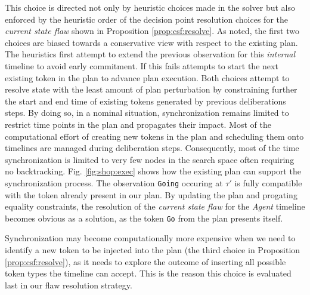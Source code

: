 This choice is directed not only by heuristic choices made in the
solver but also enforced by the heuristic order of the decision point
resolution choices for the {\em current state flaw} shown in
Proposition \ref{prop:csf:resolve}. As noted, the first two choices
are biased towards a conservative view with respect to the existing
plan. The heuristics first attempt to extend the previous observation
for this {\em internal} timeline to avoid early commitment. If this
fails \rx attempts to start the next existing token in the plan to
advance plan execution. Both choices attempt to resolve state with the
least amount of plan perturbation by constraining further the start
and end time of existing tokens generated by previous deliberations
steps. By doing so, in a nominal situation, synchronization remains
limited to restrict time points in the plan and propagates their
impact. Most of the computational effort of creating new tokens in the
plan and scheduling them onto timelines are managed during
deliberation steps. Consequently, most of the time synchronization is
limited to very few nodes in the \eu search space often requiring no
backtracking. Fig. \ref{fig:shop:exec} shows how the existing plan can
support the synchronization process. The observation \texttt{Going}
occuring at $\tau'$ is fully compatible with the token already present
in our plan. By updating the plan and progating equality constraints,
the resolution of the {\em current state flaw} for the {\em Agent}
timeline becomes obvious as a solution, as the token \texttt{Go} from
the plan presents itself.

Synchronization may become computationally more expensive when we need
to identify a new token to be injected into the plan (the third choice
in Proposition \ref{prop:csf:resolve}), as it needs to explore the
outcome of inserting all possible token types the timeline can accept.
This is the reason this choice is evaluated last in our flaw
resolution strategy.



